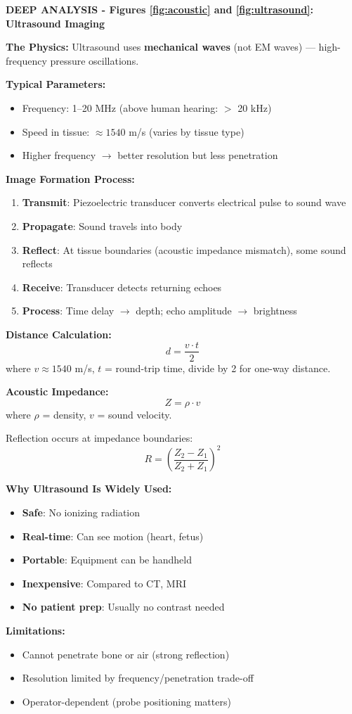 \documentclass[12pt,a4paper]{article}
\begin{document}
\begin{deepexplanation}
\textbf{DEEP ANALYSIS - Figures \ref{fig:acoustic} and \ref{fig:ultrasound}: Ultrasound Imaging}

\textbf{The Physics:}
Ultrasound uses \textbf{mechanical waves} (not EM waves) --- high-frequency pressure oscillations.

\textbf{Typical Parameters:}
\begin{itemize}
    \item Frequency: 1--20 MHz (above human hearing: $>$ 20 kHz)
    \item Speed in tissue: $\approx 1540$ m/s (varies by tissue type)
    \item Higher frequency $\rightarrow$ better resolution but less penetration
\end{itemize}

\textbf{Image Formation Process:}
\begin{enumerate}
    \item \textbf{Transmit}: Piezoelectric transducer converts electrical pulse to sound wave
    \item \textbf{Propagate}: Sound travels into body
    \item \textbf{Reflect}: At tissue boundaries (acoustic impedance mismatch), some sound reflects
    \item \textbf{Receive}: Transducer detects returning echoes
    \item \textbf{Process}: Time delay $\rightarrow$ depth; echo amplitude $\rightarrow$ brightness
\end{enumerate}

\textbf{Distance Calculation:}
\[
d = \frac{v \cdot t}{2}
\]
where $v \approx 1540$ m/s, $t$ = round-trip time, divide by 2 for one-way distance.

\textbf{Acoustic Impedance:}
\[
Z = \rho \cdot v
\]
where $\rho$ = density, $v$ = sound velocity.

Reflection occurs at impedance boundaries:
\[
R = \left(\frac{Z_2 - Z_1}{Z_2 + Z_1}\right)^2
\]

\textbf{Why Ultrasound Is Widely Used:}
\begin{itemize}
    \item \textbf{Safe}: No ionizing radiation
    \item \textbf{Real-time}: Can see motion (heart, fetus)
    \item \textbf{Portable}: Equipment can be handheld
    \item \textbf{Inexpensive}: Compared to CT, MRI
    \item \textbf{No patient prep}: Usually no contrast needed
\end{itemize}

\textbf{Limitations:}
\begin{itemize}
    \item Cannot penetrate bone or air (strong reflection)
    \item Resolution limited by frequency/penetration trade-off
    \item Operator-dependent (probe positioning matters)
\end{itemize}
\end{deepexplanation}
\end{document}
